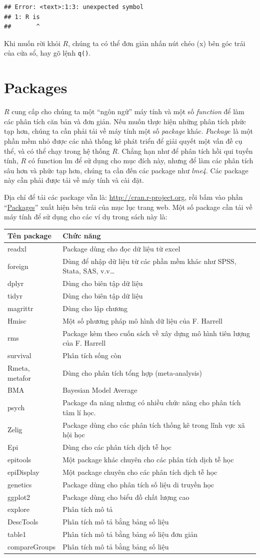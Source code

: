 \documentclass[
]{book}
\begin{document}
\begin{verbatim}
## Error: <text>:1:3: unexpected symbol
## 1: R is
##       ^
\end{verbatim}

Khi muốn rời khỏi \(R\), chúng ta có thể đơn giản nhấn nút chéo (x) bên góc trái của cửa sổ, hay gõ lệnh \texttt{q()}.

\hypertarget{packages}{%
\section{Packages}\label{packages}}

\(R\) cung cấp cho chúng ta một ``ngôn ngữ'' máy tính và một số \emph{function} để làm các phân tích căn bản và đơn giản. Nếu muốn thực hiện những phân tích phức tạp hơn, chúng ta cần phải tải về máy tính một số \emph{package} khác. \(Package\) là một phần mềm nhỏ được các nhà thống kê phát triển để giải quyết một vấn đề cụ thể, và có thể chạy trong hệ thống \(R\). Chẳng hạn như để phân tích hồi qui tuyến tính, \(R\) có function lm để sử dụng cho mục đích này, nhưng để làm các phân tích sâu hơn và phức tạp hơn, chúng ta cần đến các package như \emph{lme4}. Các package này cần phải được tải về máy tính và cài đặt.

Địa chỉ để tải các package vẫn là: \url{http://cran.r-project.org}, rồi bấm vào phần ``\href{http://cran.au.r-project.org/src/contrib/PACKAGES.html}{Packages}'' xuất hiện bên trái của mục lục trang web. Một số package cần tải về máy tính để sử dụng cho các ví dụ trong sách này là:

\begin{longtable}[]{@{}ll@{}}
\toprule
\textbf{Tên package} & \textbf{Chức năng}\tabularnewline
\midrule
\endhead
readxl & Package dùng cho đọc dữ liệu từ excel\tabularnewline
foreign & Dùng để nhập dữ liệu từ các phần mềm khác như SPSS, Stata, SAS, v.v\ldots{}\tabularnewline
dplyr & Dùng cho biên tập dữ liệu\tabularnewline
tidyr & Dùng cho biên tập dữ liệu\tabularnewline
magrittr & Dùng cho lập chương\tabularnewline
Hmisc & Một số phương pháp mô hình dữ liệu của F. Harrell\tabularnewline
rms & Package kèm theo cuốn sách về xây dựng mô hình tiên lượng của F. Harrell\tabularnewline
survival & Phân tích sống còn\tabularnewline
Rmeta, metafor & Dùng cho phân tích tổng hợp (meta-analysis)\tabularnewline
BMA & Bayesian Model Average\tabularnewline
psych & Package đa năng nhưng có nhiều chức năng cho phân tích tâm lí học.\tabularnewline
Zelig & Package dùng cho các phân tích thống kê trong lĩnh vực xã hội học\tabularnewline
Epi & Dùng cho các phân tích dịch tễ học\tabularnewline
epitools & Một package khác chuyên cho các phân tích dịch tễ học\tabularnewline
epiDisplay & Một package chuyên cho các phân tích dịch tễ học\tabularnewline
genetics & Package dùng cho phân tích số liệu di truyền học\tabularnewline
ggplot2 & Package dùng cho biểu đồ chất lượng cao\tabularnewline
explore & Phân tích mô tả\tabularnewline
DescTools & Phân tích mô tả bằng bảng số liệu\tabularnewline
table1 & Phân tích mô tả bằng bảng số liệu đơn giản\tabularnewline
compareGroups & Phân tích mô tả bằng bảng số liệu\tabularnewline
\bottomrule
\end{longtable}
\end{document}
